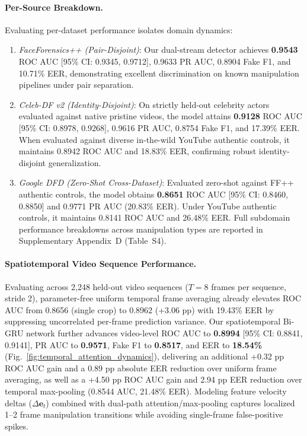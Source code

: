 \documentclass[10pt,twocolumn,letterpaper]{article}
\begin{document}
\paragraph{Per-Source Breakdown.}
Evaluating per-dataset performance isolates domain dynamics:
\begin{enumerate}
\item \textit{FaceForensics++ (Pair-Disjoint)}: Our dual-stream detector achieves \textbf{0.9543} ROC AUC [95\% CI: 0.9345, 0.9712], 0.9633 PR AUC, 0.8904 Fake F1, and 10.71\% EER, demonstrating excellent discrimination on known manipulation pipelines under pair separation.
\item \textit{Celeb-DF v2 (Identity-Disjoint)}: On strictly held-out celebrity actors evaluated against native pristine videos, the model attains \textbf{0.9128} ROC AUC [95\% CI: 0.8978, 0.9268], 0.9616 PR AUC, 0.8754 Fake F1, and 17.39\% EER. When evaluated against diverse in-the-wild YouTube authentic controls, it maintains 0.8942 ROC AUC and 18.83\% EER, confirming robust identity-disjoint generalization.
\item \textit{Google DFD (Zero-Shot Cross-Dataset)}: Evaluated zero-shot against FF++ authentic controls, the model obtains \textbf{0.8651} ROC AUC [95\% CI: 0.8460, 0.8850] and 0.9771 PR AUC (20.83\% EER). Under YouTube authentic controls, it maintains 0.8141 ROC AUC and 26.48\% EER. Full subdomain performance breakdowns across manipulation types are reported in Supplementary Appendix~D (Table~S4).
\end{enumerate}

\paragraph{Spatiotemporal Video Sequence Performance.}
Evaluating across 2,248 held-out video sequences ($T = 8$ frames per sequence, stride 2), parameter-free uniform temporal frame averaging already elevates ROC AUC from 0.8656 (single crop) to 0.8962 (+3.06 pp) with 19.43\% EER by suppressing uncorrelated per-frame prediction variance. Our spatiotemporal Bi-GRU network further advances video-level ROC AUC to \textbf{0.8994} [95\% CI: 0.8841, 0.9141], PR AUC to \textbf{0.9571}, Fake F1 to \textbf{0.8517}, and EER to \textbf{18.54\%} (Fig.~\ref{fig:temporal_attention_dynamics}), delivering an additional +0.32 pp ROC AUC gain and a 0.89 pp absolute EER reduction over uniform frame averaging, as well as a +4.50 pp ROC AUC gain and 2.94 pp EER reduction over temporal max-pooling (0.8544 AUC, 21.48\% EER). Modeling feature velocity deltas ($\Delta \mathbf{e}_t$) combined with dual-path attention/max-pooling captures localized 1--2 frame manipulation transitions while avoiding single-frame false-positive spikes.
\end{document}
